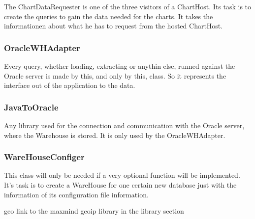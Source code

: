The ChartDataRequester is one of the three visitors of a ChartHost. Its task is to 
create the queries to gain the data needed for the charts. It takes the informationen about what he
has to request from the hosted ChartHost.



\subsubsection*{OracleWHAdapter}

Every query, whether loading, extracting or anythin else, runned against the Oracle server is made by this,
and only by this, class. So it represents the interface out of the application to the data.



\subsubsection*{JavaToOracle}

Any library used for the connection and communication with the Oracle server, 
where the Warehouse is stored. It is only used by the OracleWHAdapter.



\subsubsection*{WareHouseConfiger}

This class will only be needed if a very optional function will be implemented. It's task is to create
a WareHouse for one certain new database just with the information of its configuration file information.



geo
 link to the maxmind geoip library in the library section

